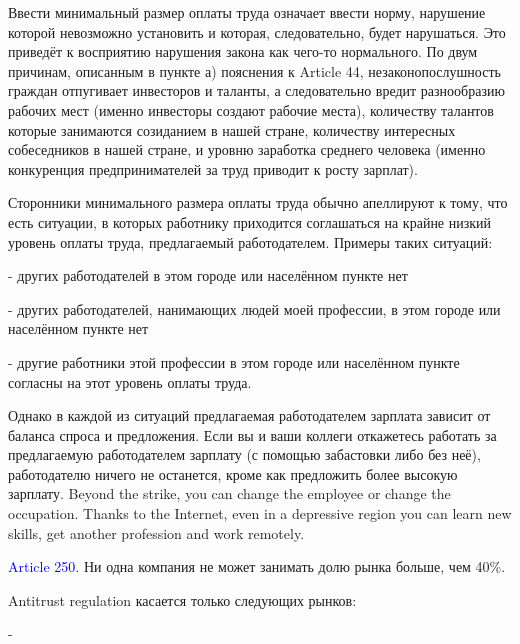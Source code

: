 \documentclass[11pt]{article}
\theoremstyle{remark}
\theoremstyle{definition}
\begin{document}
Ввести минимальный размер оплаты труда означает ввести норму, нарушение которой невозможно установить и которая, следовательно, будет нарушаться. Это приведёт к восприятию нарушения закона как чего-то нормального. По двум причинам, описанным в пункте а) пояснения к Article 44, незаконопослушность граждан отпугивает инвесторов и таланты, а следовательно вредит разнообразию рабочих мест (именно инвесторы создают рабочие места), количеству талантов которые занимаются созиданием в нашей стране, количеству интересных собеседников в нашей стране, и уровню заработка среднего человека (именно конкуренция предпринимателей за труд приводит к росту зарплат).





Сторонники минимального размера оплаты труда обычно апеллируют к тому, что есть ситуации, в которых работнику приходится соглашаться на крайне низкий уровень оплаты труда, предлагаемый работодателем. Примеры таких ситуаций:

- других работодателей в этом городе или населённом пункте нет

- других работодателей, нанимающих людей моей профессии, в этом городе или населённом пункте нет

- другие работники этой профессии в этом городе или населённом пункте согласны на этот уровень оплаты труда.


Однако в каждой из ситуаций предлагаемая работодателем зарплата зависит от баланса спроса и предложения. Если вы и ваши коллеги откажетесь работать за предлагаемую работодателем зарплату (с помощью забастовки либо без неё), работодателю ничего не останется, кроме как предложить более высокую зарплату. Beyond the strike, you can change the employee or change the occupation. Thanks to the Internet, even in a depressive region you can learn new skills, get another profession and work remotely.





\color{black}










\textcolor{blue}{Article 250.} Ни одна компания не может занимать долю рынка больше, чем 40\%. 

Antitrust regulation касается только следующих рынков:

- 

\color{blue}
\end{document}
